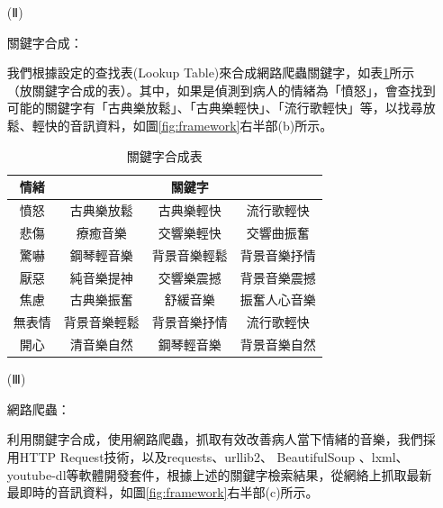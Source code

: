 \documentclass[12pt]{scrreprt}
\begin{document}
\begin{itemize}
\item[(Ⅱ)]{\begin{bfseries}{關鍵字合成：}\end{bfseries}}

我們根據設定的查找表(Lookup Table)來合成網路爬蟲關鍵字，如表\ref{lab:2}所示（放關鍵字合成的表）。其中，如果是偵測到病人的情緒為「憤怒」，會查找到可能的關鍵字有「古典樂放鬆」、「古典樂輕快」、「流行歌輕快」等，以找尋放鬆、輕快的音訊資料，如圖\ref{fig:framework}右半部(b)所示。\\

\renewcommand{\arraystretch}{1.2} 
\renewcommand{\multirowsetup}{\centering}
\begin{table}[h]
\caption{關鍵字合成表}
    \centering
\begin{tabular}{|*{4}{r|}}
\hline
\multicolumn{1}{|c|}{情緒}
& \multicolumn{3}{c|}{關鍵字} \\\hline
\multicolumn{1}{|c}{憤怒}&\multicolumn{1}{|c}{古典樂放鬆}&\multicolumn{1}{|c}{古典樂輕快}&\multicolumn{1}{|c|}{流行歌輕快} \\\hline
\multicolumn{1}{|c}{悲傷}&\multicolumn{1}{|c}{療癒音樂}&\multicolumn{1}{|c}{交響樂輕快}&\multicolumn{1}{|c|}{交響曲振奮} \\\hline
\multicolumn{1}{|c}{驚嚇}&\multicolumn{1}{|c}{鋼琴輕音樂}&\multicolumn{1}{|c}{背景音樂輕鬆}&\multicolumn{1}{|c|}{背景音樂抒情}\\\hline
\multicolumn{1}{|c}{厭惡}&\multicolumn{1}{|c}{純音樂提神}&\multicolumn{1}{|c}{交響樂震撼}&\multicolumn{1}{|c|}{背景音樂震撼}\\\hline
\multicolumn{1}{|c}{焦慮}&\multicolumn{1}{|c}{古典樂振奮}   &\multicolumn{1}{|c}{舒緩音樂}   &\multicolumn{1}{|c|}{振奮人心音樂}\\\hline
\multicolumn{1}{|c}{無表情}&\multicolumn{1}{|c}{背景音樂輕鬆}   &\multicolumn{1}{|c}{背景音樂抒情}   &\multicolumn{1}{|c|}{流行歌輕快}\\\hline
\multicolumn{1}{|c}{開心}&\multicolumn{1}{|c}{清音樂自然}   &\multicolumn{1}{|c}{鋼琴輕音樂}   &\multicolumn{1}{|c|}{背景音樂自然}\\\hline
\end{tabular}
\label{lab:2}
\end{table}

\item[(Ⅲ)]{\begin{bfseries}{網路爬蟲：}\end{bfseries}}

利用關鍵字合成，使用網路爬蟲，抓取有效改善病人當下情緒的音樂，我們採用HTTP Request技術，以及requests、urllib2、 BeautifulSoup 、lxml、 youtube-dl等軟體開發套件，根據上述的關鍵字檢索結果，從網絡上抓取最新最即時的音訊資料，如圖\ref{fig:framework}右半部(c)所示。\\


\end{itemize}
\end{document}
